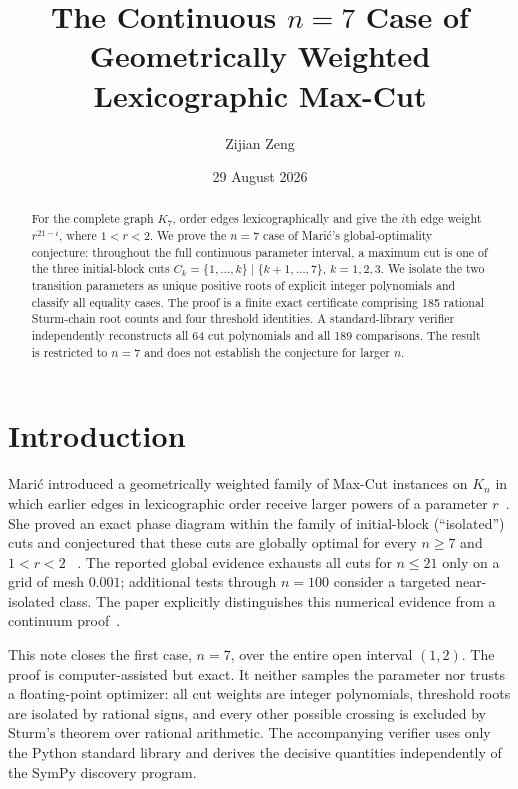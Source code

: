 \documentclass[11pt]{amsart}
\title[Geometric Lexicographic Max-Cut on $K_7$]{The Continuous $n=7$ Case of Geometrically Weighted Lexicographic Max-Cut}
\author{Zijian Zeng}
\date{29 August 2026}
\theoremstyle{definition}
\begin{document}
\begin{abstract}
For the complete graph $K_7$, order edges lexicographically and give the
$i$th edge weight $r^{21-i}$, where $1<r<2$.  We prove the $n=7$ case of
Mari\'c's global-optimality conjecture: throughout the full continuous
parameter interval, a maximum cut is one of the three initial-block cuts
$C_k=\{1,\ldots,k\}\mid\{k+1,\ldots,7\}$, $k=1,2,3$.  We isolate the two
transition parameters as unique positive roots of explicit integer
polynomials and classify all equality cases.  The proof is a finite exact
certificate comprising 185 rational Sturm-chain root counts and four
threshold identities.  A standard-library verifier independently
reconstructs all 64 cut polynomials and all 189 comparisons.  The result is
restricted to $n=7$ and does not establish the conjecture for larger $n$.
\end{abstract}

\maketitle

\section{Introduction}

Mari\'c introduced a geometrically weighted family of Max-Cut instances on
$K_n$ in which earlier edges in lexicographic order receive larger powers of
a parameter $r$~\cite{Maric2026}.  She proved an exact phase diagram within
the family of initial-block (``isolated'') cuts and conjectured that these
cuts are globally optimal for every $n\geq 7$ and $1<r<2$
~\cite[Theorem~4.10 and Conjecture~5.1]{Maric2026}.  The reported global
evidence exhausts all cuts for $n\leq21$ only on a grid of mesh $0.001$;
additional tests through $n=100$ consider a targeted near-isolated class.
The paper explicitly distinguishes this numerical evidence from a continuum
proof~\cite[Sections~3 and 5.1]{Maric2026}.

This note closes the first case, $n=7$, over the entire open interval
$(1,2)$.  The proof is computer-assisted but exact.  It neither samples the
parameter nor trusts a floating-point optimizer: all cut weights are integer
polynomials, threshold roots are isolated by rational signs, and every other
possible crossing is excluded by Sturm's theorem over rational arithmetic.
The accompanying verifier uses only the Python standard library and derives
the decisive quantities independently of the SymPy discovery program.
\end{document}
